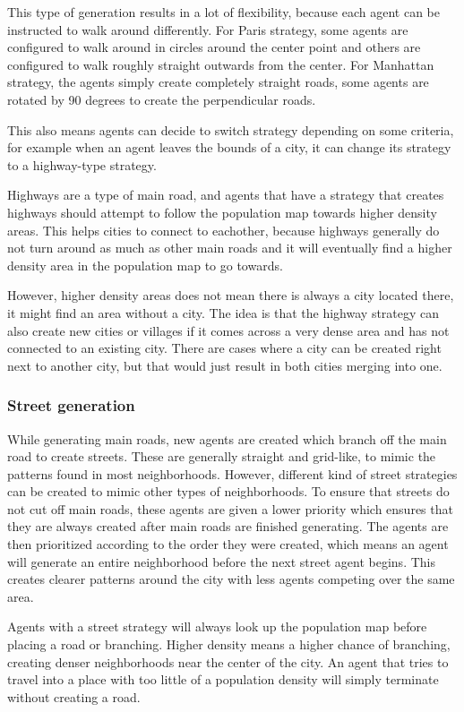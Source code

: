 This type of generation results in a lot of flexibility, because each agent can be instructed to walk around differently.
For Paris strategy, some agents are configured to walk around in circles around the center point and others are configured to walk roughly straight outwards from the center.
For Manhattan strategy, the agents simply create completely straight roads, some agents are rotated by 90 degrees to create the perpendicular roads.

This also means agents can decide to switch strategy depending on some criteria, for example when an agent leaves the bounds of a city, it can change its strategy to a highway-type strategy.

Highways are a type of main road, and agents that have a strategy that creates highways should attempt to follow the population map towards higher density areas.
This helps cities to connect to eachother, because highways generally do not turn around as much as other main roads and it will eventually find a higher density area in the population map to go towards.

However, higher density areas does not mean there is always a city located there, it might find an area without a city.
The idea is that the highway strategy can also create new cities or villages if it comes across a very dense area and has not connected to an existing city.
There are cases where a city can be created right next to another city, but that would just result in both cities merging into one.

\subsubsection{Street generation}
While generating main roads, new agents are created which branch off the main road to create streets.
These are generally straight and grid-like, to mimic the patterns found in most neighborhoods.
However, different kind of street strategies can be created to mimic other types of neighborhoods.
To ensure that streets do not cut off main roads, these agents are given a lower priority which ensures that they are always created after main roads are finished generating.
The agents are then prioritized according to the order they were created, which means an agent will generate an entire neighborhood before the next street agent begins.
This creates clearer patterns around the city with less agents competing over the same area.

Agents with a street strategy will always look up the population map before placing a road or branching.
Higher density means a higher chance of branching, creating denser neighborhoods near the center of the city.
An agent that tries to travel into a place with too little of a population density will simply terminate without creating a road. 
